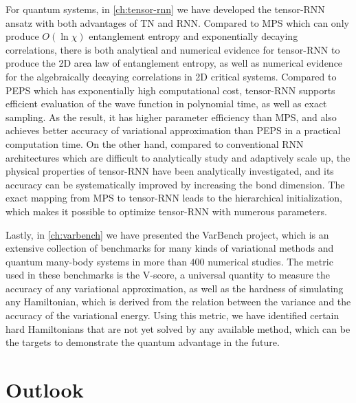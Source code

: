 For quantum systems, in \cref{ch:tensor-rnn} we have developed the tensor-RNN ansatz with both advantages of TN and RNN. Compared to MPS which can only produce $O(\ln \chi)$ entanglement entropy and exponentially decaying correlations, there is both analytical and numerical evidence for tensor-RNN to produce the 2D area law of entanglement entropy, as well as numerical evidence for the algebraically decaying correlations in 2D critical systems. Compared to PEPS which has exponentially high computational cost, tensor-RNN supports efficient evaluation of the wave function in polynomial time, as well as exact sampling. As the result, it has higher parameter efficiency than MPS, and also achieves better accuracy of variational approximation than PEPS in a practical computation time. On the other hand, compared to conventional RNN architectures which are difficult to analytically study and adaptively scale up, the physical properties of tensor-RNN have been analytically investigated, and its accuracy can be systematically improved by increasing the bond dimension. The exact mapping from MPS to tensor-RNN leads to the hierarchical initialization, which makes it possible to optimize tensor-RNN with numerous parameters.

Lastly, in \cref{ch:varbench} we have presented the VarBench project, which is an extensive collection of benchmarks for many kinds of variational methods and quantum many-body systems in more than $400$ numerical studies. The metric used in these benchmarks is the V-score, a universal quantity to measure the accuracy of any variational approximation, as well as the hardness of simulating any Hamiltonian, which is derived from the relation between the variance and the accuracy of the variational energy. Using this metric, we have identified certain hard Hamiltonians that are not yet solved by any available method, which can be the targets to demonstrate the quantum advantage in the future.

\section{Outlook}

